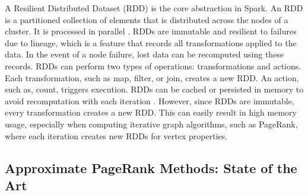 
A Resilient Distributed Dataset (RDD) is the core abstraction in Spark. An RDD is a partitioned collection of elements that is distributed across the nodes of a cluster. It is processed in parallel \cite{apache_spark_rdd_2025}. RDDs are immutable and resilient to failures due to lineage, which is a feature that records all transformations applied to the data. In the event of a node failure, lost data can be recomputed using these records. RDDs can perform two types of operations: transformations and actions. Each transformation, such as map, filter, or join, creates a new RDD. An action, such as, count, triggers execution. RDDs can be cached or persisted in memory to avoid recomputation with each iteration \cite{chambers_spark_2018}. However, since RDDs are immutable, every transformation creates a new RDD. This can easily result in high memory usage, especially when computing iterative graph algorithms, such as PageRank, where each iteration creates new RDDs for vertex properties. 



\subsection{Approximate PageRank Methods: State of the Art}

